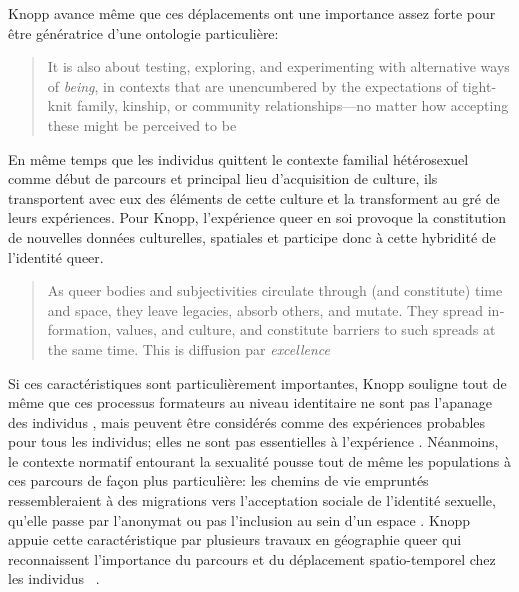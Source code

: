 Knopp avance même que ces déplacements ont une importance assez forte pour être génératrice d'une ontologie particulière:
\foreignblockquote{english}[{\cite[123]{Knopp2004}}][.]{It is also about testing, exploring, and experimenting with alternative ways of \emph{being}, in contexts that are unencumbered by the expectations of tight-knit family, kinship, or community relationships—no matter how accepting these might be perceived to be} 
En même temps que les individus \lgbt{} quittent le contexte familial hétérosexuel comme début de parcours et principal lieu d'acquisition de culture, ils transportent avec eux des éléments de cette culture et la transforment au gré de leurs expériences. 
Pour Knopp, l'expérience queer en soi provoque la constitution de nouvelles données culturelles, spatiales et participe donc à cette hybridité de l'identité queer.
\foreignblockquote{english}[{\cite[130]{Knopp2004}}][.]{As queer bodies and subjectivities circulate through (and constitute) time and space, they leave legacies, absorb others, and mutate. They spread information, values, and culture, and constitute barriers to such spreads at the same time. This is diffusion par \emph{excellence}}

Si ces caractéristiques sont particulièrement importantes, Knopp souligne tout de même que ces processus formateurs au niveau identitaire ne sont pas l'apanage des individus \lgbt{}, mais peuvent être considérés comme des expériences probables pour tous les individus; elles ne sont pas essentielles à l'expérience \lgbt{}.
Néanmoins, le contexte normatif entourant la sexualité pousse tout de même les populations \lgbt{} à ces parcours de façon plus particulière: les chemins de vie empruntés ressembleraient à des migrations vers l'acceptation sociale de l'identité sexuelle, qu'elle passe par l'anonymat ou pas l'inclusion au sein d'un espace \lgbt{}. 
Knopp appuie cette caractéristique par plusieurs travaux en géographie queer qui reconnaissent l'importance du parcours et du déplacement spatio-temporel chez les individus \lgbt{}~\citep[123]{Knopp2004}.



